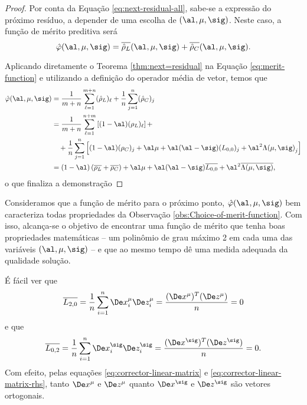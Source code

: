 \begin{proof}  Por conta da Equação \eqref{eq:next-residual-all}, sabe-se a expressão do
próximo resíduo, a depender de uma escolha de $(\al,\mu,\sig)$. Neste caso, 
a função de mérito preditiva será
\begin{equation}
\label{eq:merit-function}
\nextphi(\al,\mu,\sig) =
\dbvec{\hat{\rho}_L}(\al,\mu,\sig)+
\dbvec{\hat{\rho}_C}(\al,\mu,\sig).
\end{equation}

 Aplicando diretamente o Teorema \ref{thm:next=residual} na
Equação \eqref{eq:merit-function} e utilizando a definição do operador média de vetor, temos que
 \[
\begin{aligned}
\nextphi(\al,\mu,\sig) & =
\frac{1}{m+n}\sum_{\ell=1}^{m+n}(\hat{\rho}_L)_\ell +
\frac{1}{n}\sum_{j=1}^{n}(\hat{\rho}_C)_j \\
						 & = \frac{1}{m+n}\sum_{\ell=1}^{n+m}\left[(1-\al)(\rho_L)_\ell 
						 \right] +
						 \\
				 	 & \quad  + \frac{1}{n}\sum_{j=1}^{n}  \left[ (1-\al)(\rho_C)_j +
				 	 \al\mu + \al(\al-\sig)(L_{0,0})_j + \al^2{\Lambda(\mu,\sig)}_j \right] \\
				 	 & = (1-\al)\left(\dbvec{\rho_L} + \dbvec{\rho_C}\right) + \al\mu +
\al(\al-\sig)\dbvec{L_{0,0}} + \al^2\dbvec{\Lambda(\mu,\sig)},	
\end{aligned}
\]
o que finaliza a demonstração
\end{proof}


Consideramos que a função de mérito para o próximo ponto, $\nextphi(\al,\mu,\sig) $ bem caracteriza todas propriedades da Observação \ref{obs:Choice-of-merit-function}. Com isso, alcança-se o objetivo de encontrar uma função de mérito que tenha boas propriedades matemáticas -- um polinômio de grau máximo 2 em cada uma das variáveis $(\al,\mu,\sig)$ --  e que ao mesmo tempo dê uma medida adequada da qualidade solução.


\begin{obs}\label{obs:L_02-L20}
É fácil ver que   \[\dbvec{L_{2,0}} = \frac{1}{n} \sum_{i=1}^n
\Dex_i^\mu\Dez_i^\mu = \frac{(\Dex^\mu)^T(\Dez^\mu)}{n} = 0\] e que  
  \[\dbvec{L_{0,2}} = \frac{1}{n} \sum_{i=1}^n
\Dex_i^\sig\Dez_i^\sig = \frac{(\Dex^\sig)^T(\Dez^\sig)}{n} = 0.\] 
Com efeito, pelas equações \eqref{eq:corrector-linear-matrix} e \eqref{eq:corrector-linear-matrix-rhs},
 tanto $\Dex^\mu$ e $\Dez^\mu$ quanto $\Dex^\sig$ e $\Dez^\sig$ são vetores ortogonais. 


\end{obs}


